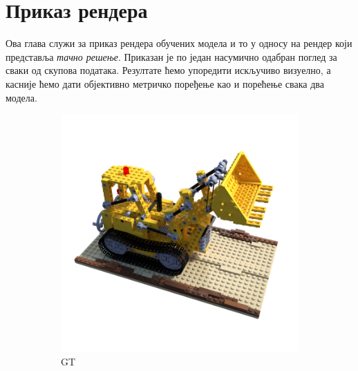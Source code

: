 \documentclass[12pt, a4paper, twoside]{book}
\numberwithin{equation}{chapter}
\numberwithin{theorem}{section}
\numberwithin{definition}{section}
\numberwithin{definitionChapter}{chapter}
\begin{document}
\section{Приказ рендера}
Ова глава служи за приказ рендера обучених модела и то у односу на рендер који представља \textit{тачно решење}.
Приказан је по један насумично одабран поглед за сваки од скупова података. Резултате ћемо упоредити искључиво
визуелно, а касније ћемо дати објективно метричко поређење као и порећење свака два модела.

	\begin{figure}[H]
		\centering
		\begin{subfigure}{0.475\textwidth}
			\centering
			\includegraphics[scale=0.25]{img/gt/gt_lego_31.png}
			\caption{GT}
		\end{subfigure}
		\begin{subfigure}{0.475\textwidth}
			\centering

\end{subfigure}
\end{figure}
\end{document}
